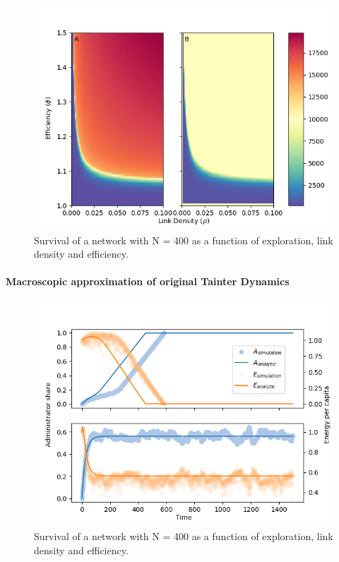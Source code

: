 \begin{figure}[htb]
    \centering
    \includegraphics[width = \linewidth]{../figures/parscan_base0.png}
    \caption{Survival of a network with N = 400 as a function of exploration, link density and efficiency.}
    \label{fig:survival}
\end{figure}



\paragraph{Macroscopic approximation of original Tainter Dynamics}

\begin{figure}[htb]
    \centering
    \includegraphics[width = \linewidth]{../figures/comp_integration-model_exploration.png}
    \caption{Survival of a network with N = 400 as a function of exploration, link density and efficiency.}
    \label{fig:survival}
\end{figure}


